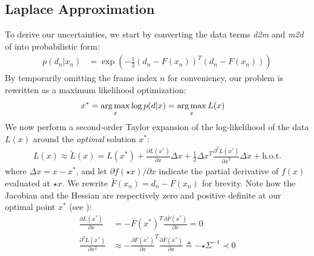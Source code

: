 
\subsection{Laplace Approximation}
\label{app:laplace-approximation}
To derive our uncertainties, we start by converting the data terms \emph{d2m} and \emph{m2d} of  into probabilistic form:
\begin{align}
p(d_n|x_n) &= \exp \left( - \tfrac{1}{2}(d_n - F(x_n))^T (d_n - F(x_n)) \right)
\label{eq:posterior}
\end{align}
% 
By temporarily omitting the frame index $n$ for conveniency, our problem is rewritten as a maximum likelihood optimization:
%
\begin{align}
x^* &= \operatorname*{arg\,max}_{x} \log p(d|x) = \operatorname*{arg\,max}_x L(x)
\label{eq:independent}
\end{align}
%
We now perform a second-order Taylor expansion of the log-likelihood of the data $L(x)$ around the \emph{optimal} solution $x^*$:
%
\begin{align}
L(x) \approx \tilde{L}(x) = L(x^*)   
+ \tfrac{\partial L(x^*) }{\partial x}  \Delta x 
+ \tfrac{1}{2} \Delta x^T\tfrac{\partial^2 L(x^*)}{{\partial x}^2} \Delta x + \text{h.o.t.}
\label{eq:taylor}
\end{align}
%
where $\Delta x=x - x^*$, and let {\small $\partial f(\star{x})/\partial x$} indicate the partial derivative of $f(x)$ evaluated at $\star{x}$.
We rewrite {\small $\bar{F}(x_n) = d_n - F(x_n)$} for brevity. Note how the Jacobian and the Hessian are respectively zero and positive definite at our optimal point $x^*$ (see \cite[Sec.~10.2]{nocedal2006numerical}):
%
\begin{align}
\tfrac{\partial L(x^*)}{\partial x} &= - \bar{F}(x^*)^T 
\tfrac{\partial \bar{F}(x^*)}{\partial x} = 0 
\label{eq:taylor-jacobian}
\\
\tfrac{\partial^2 L(x^*)}{\partial x^2} 
& \approx - \tfrac{\partial \bar{F}(x^*)}{\partial x}^T \tfrac{\partial \bar{F}(x^*)}{\partial x}
\triangleq %
-{\star{\Sigma}}^{-1} \prec 0
\label{eq:taylor-hessian}
\end{align}
